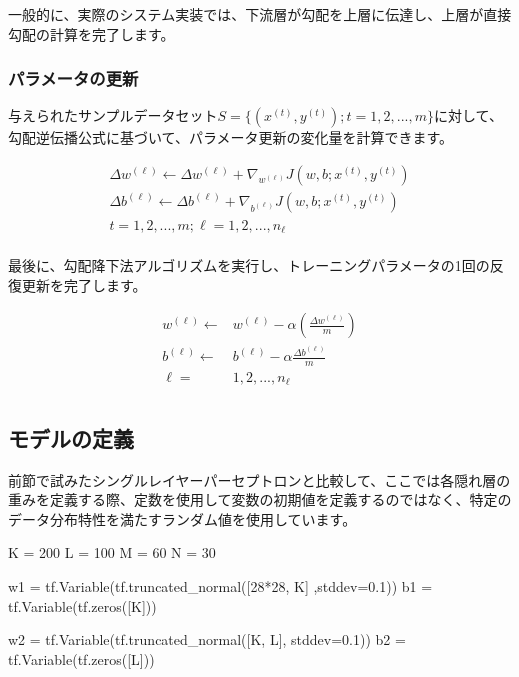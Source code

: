 \begin{content}
\begin{content}
一般的に、実際のシステム実装では、下流層が勾配を上層に伝達し、上層が直接勾配の計算を完了します。

\subsubsection{パラメータの更新}

与えられたサンプルデータセット$ S = \{ ({x^{(t)}},{y^{(t)}});t = 1,2,...,m\} $に対して、勾配逆伝播公式に基づいて、パラメータ更新の変化量を計算できます。

\[\begin{aligned}
  \Delta {w^{(\ell )}} \leftarrow \Delta {w^{(\ell )}} + {\nabla _{{w^{(\ell )}}}}J\left( {w,b;{x^{(t)}},{y^{(t)}}} \right) \\ 
  \Delta {b^{(\ell )}} \leftarrow \Delta {b^{(\ell )}} + {\nabla _{{b^{(\ell )}}}}J\left( {w,b;{x^{(t)}},{y^{(t)}}} \right) \\ 
  t = 1,2,...,m;\ell  = 1,2,...,{n_\ell } \\ 
\end{aligned} \]

最後に、勾配降下法アルゴリズムを実行し、トレーニングパラメータの1回の反復更新を完了します。

\[\begin{aligned}
  {w^{(\ell )}} \leftarrow  & {w^{(\ell )}} - \alpha \left( {\frac{{\Delta {w^{(\ell )}}}}{m}} \right) \\ 
  {b^{(\ell )}} \leftarrow  & {b^{(\ell )}} - \alpha \frac{{\Delta {b^{(\ell )}}}}{m} \\ 
  \ell  = & 1,2,...,{n_\ell }  \\
\end{aligned} \]

\subsection{モデルの定義}

前節で試みたシングルレイヤーパーセプトロンと比較して、ここでは各隠れ層の重みを定義する際、定数を使用して変数の初期値を定義するのではなく、特定のデータ分布特性を満たすランダム値を使用しています。

\begin{leftbar}
\begin{python}
K = 200
L = 100
M = 60
N = 30

w1 = tf.Variable(tf.truncated_normal([28*28, K] ,stddev=0.1)) 
b1 = tf.Variable(tf.zeros([K]))

w2 = tf.Variable(tf.truncated_normal([K, L], stddev=0.1))
b2 = tf.Variable(tf.zeros([L]))


\end{python}
\end{leftbar}
\end{content}
\end{content}

